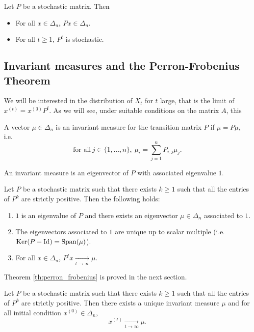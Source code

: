 \documentclass[11pt,nocut]{article}
\begin{document}
\begin{corollary}\label{cor:stab}
	Let $P$ be a stochastic matrix. Then
	\begin{itemize}
		\item For all $x \in \Delta_n$, $Px \in \Delta_n$.
		\item For all $t \geq 1$, $P^t$ is stochastic.
	\end{itemize}
\end{corollary}


\subsection{Invariant measures and the Perron-Frobenius Theorem}
We will be interested in the distribution of $X_t$ for $t$ large, that is the limit of $x^{(t)} = x^{(0)} P^t$. As we will see, under suitable conditions on the matrix $A$, this

\begin{definition}
	A vector $\mu \in \Delta_n$ is an invariant measure for the transition matrix $P$ if $\mu = P \mu$, i.e.\
	$$
	\text{for all} \ j \in \{1, \dots, n\}, \ \mu_i = \sum_{j=1}^n P_{i,j} \mu_j.
	$$
\end{definition}

\begin{remark}
	An invariant measure is an eigenvector of $P$ with associated eigenvalue $1$.
\end{remark}


\begin{theorem}\label{th:perron_frobenius}
	Let $P$ be a stochastic matrix such that there exists $k \geq 1$ such that all the entries of $P^k$ are strictly positive. Then the following holds:
	\begin{enumerate}[label=(\roman*),noitemsep]
		\item\label{item:i} $1$ is an eigenvalue of $P$ and there exists an eigenvector $\mu \in \Delta_n$ associated to $1$.
		\item\label{item:ii} The eigenvectors associated to $1$ are unique up to scalar multiple (i.e.\ ${{\rm Ker}}(P-{{\rm Id}}) = {{\rm Span}}(\mu)$).
		\item\label{item:iii} For all $x \in \Delta_n$, $P^t x \xrightarrow[t \to \infty]{} \mu$.
	\end{enumerate}
\end{theorem}

Theorem \ref{th:perron_frobenius} is proved in the next section.

\begin{corollary}
	Let $P$ be a stochastic matrix such that there exists $k \geq 1$ such that all the entries of $P^k$ are strictly positive. Then there exists a unique invariant measure $\mu$ and for all initial condition $x^{(0)} \in \Delta_n$,
	$$
	x^{(t)} \xrightarrow[t \to \infty]{} \mu.
	$$
\end{corollary}
\end{document}
